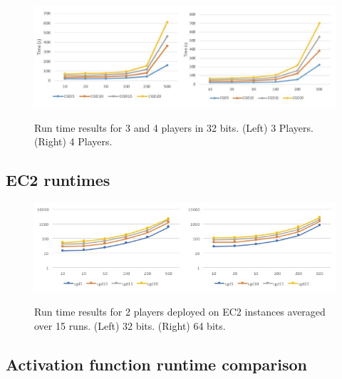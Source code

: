 \documentclass{article}
\begin{document}
\begin{figure}[h]
\centering
  \caption{Run time results for 3 and 4 players in 32 bits. (Left) 3 Players. (Right) 4 Players.}

  \includegraphics[scale=0.6]{multi.jpg}
  \label{fig:result3}
\end{figure}

\subsection{EC2 runtimes}

\begin{figure}[h]
\centering
  \caption{Run time results for 2 players deployed on EC2 instances averaged over 15 runs. (Left) 32 bits. (Right) 64 bits.}
  \includegraphics[scale=0.7]{ec2.jpg}
  \label{fig:result4}
\end{figure}

\subsection{Activation function runtime comparison}
\end{document}
